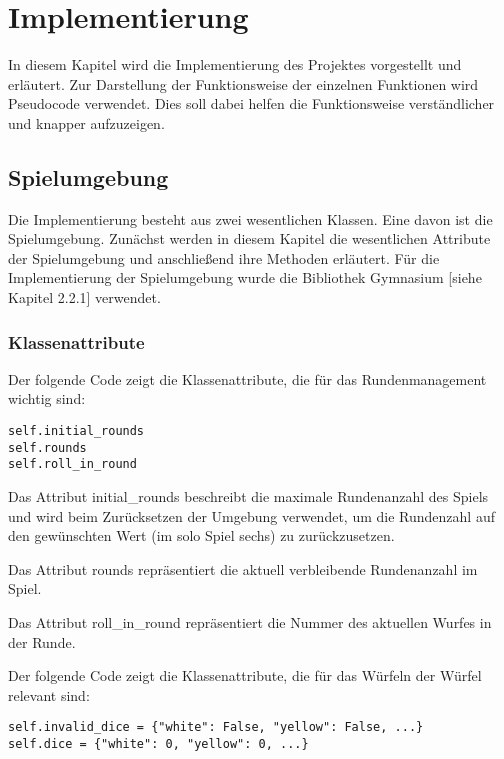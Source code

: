 \section{Implementierung}
In diesem Kapitel wird die Implementierung des Projektes vorgestellt und erläutert. Zur Darstellung der Funktionsweise der einzelnen Funktionen wird Pseudocode verwendet. Dies soll dabei helfen die Funktionsweise verständlicher und knapper aufzuzeigen.
\subsection{Spielumgebung}
Die Implementierung besteht aus zwei wesentlichen Klassen. Eine davon ist die Spielumgebung. Zunächst werden in diesem Kapitel die wesentlichen Attribute der Spielumgebung und anschließend ihre Methoden erläutert. Für die Implementierung der Spielumgebung wurde die Bibliothek Gymnasium [siehe Kapitel 2.2.1] verwendet.
\subsubsection{Klassenattribute}
\begin{minipage}{\linewidth}
Der folgende Code zeigt die Klassenattribute, die für das Rundenmanagement wichtig sind:
\vspace{0.5cm}
\begin{lstlisting}[caption={Klassenattribute für Runden}]
self.initial_rounds
self.rounds
self.roll_in_round
\end{lstlisting}
\end{minipage}

Das Attribut initial\_rounds beschreibt die maximale Rundenanzahl des Spiels und wird beim Zurücksetzen der Umgebung verwendet, um die Rundenzahl auf den gewünschten Wert (im solo Spiel sechs) zu zurückzusetzen.

Das Attribut rounds repräsentiert die aktuell verbleibende Rundenanzahl im Spiel.

Das Attribut roll\_in\_round repräsentiert die Nummer des aktuellen Wurfes in der Runde.\\

\begin{minipage}{\linewidth}
Der folgende Code zeigt die Klassenattribute, die für das Würfeln der Würfel relevant sind:
\vspace{0.5cm}
\begin{lstlisting}[caption={Klassenattribute für Würfel}]
self.invalid_dice = {"white": False, "yellow": False, ...}
self.dice = {"white": 0, "yellow": 0, ...}
\end{lstlisting}
\end{minipage}

